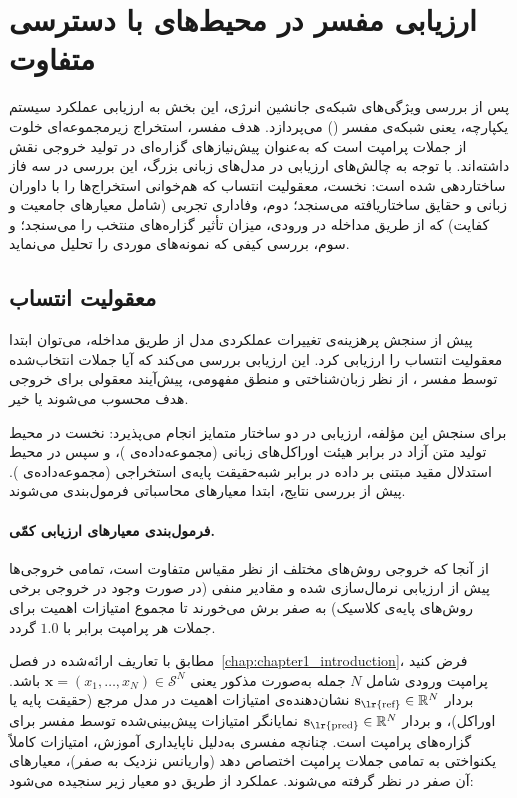 \section{ارزیابی مفسر در محیط‌های با دسترسی متفاوت}\label{sec:5-3}

پس از بررسی ویژگی‌های شبکه‌ی جانشین انرژی، این بخش به ارزیابی عملکرد سیستم یکپارچه، یعنی شبکه‌ی مفسر () می‌پردازد. هدف مفسر، استخراج زیرمجموعه‌ای خلوت از جملات پرامپت است که به‌عنوان پیش‌نیازهای گزاره‌ای در تولید خروجی نقش داشته‌اند. با توجه به چالش‌های ارزیابی در مدل‌های زبانی بزرگ، این بررسی در سه فاز ساختاردهی شده است: نخست، معقولیت انتساب که هم‌خوانی استخراج‌ها را با داوران زبانی و حقایق ساختاریافته می‌سنجد؛ دوم، وفاداری تجربی (شامل معیارهای جامعیت و کفایت) که از طریق مداخله در ورودی، میزان تأثیر گزاره‌های منتخب را می‌سنجد؛ و سوم، بررسی کیفی که نمونه‌های موردی را تحلیل می‌نماید.


\subsection{معقولیت انتساب}\label{sec:5-3-1}

پیش از سنجش پرهزینه‌ی تغییرات عملکردی مدل از طریق مداخله، می‌توان ابتدا معقولیت انتساب را ارزیابی کرد. این ارزیابی بررسی می‌کند که آیا جملات انتخاب‌شده توسط مفسر ، از نظر زبان‌شناختی و منطق مفهومی، پیش‌آیند معقولی برای خروجی هدف محسوب می‌شوند یا خیر. 

برای سنجش این مؤلفه، ارزیابی در دو ساختار متمایز انجام می‌پذیرد: نخست در محیط تولید متن آزاد در برابر هیئت اوراکل‌های زبانی (مجموعه‌داده‌ی )، و سپس در محیط استدلال مقید مبتنی بر داده در برابر شبه‌حقیقت پایه‌ی استخراجی (مجموعه‌داده‌ی ). پیش از بررسی نتایج، ابتدا معیارهای محاسباتی فرمول‌بندی می‌شوند.

\paragraph{فرمول‌بندی معیارهای ارزیابی کمّی.}
از آنجا که خروجی روش‌های مختلف از نظر مقیاس متفاوت است، تمامی خروجی‌ها پیش از ارزیابی نرمال‌سازی شده و مقادیر منفی (در صورت وجود در خروجی برخی روش‌های پایه‌ی کلاسیک) به صفر برش می‌خورند تا مجموع امتیازات اهمیت برای جملات هر پرامپت برابر با $1.0$ گردد. 

مطابق با تعاریف ارائه‌شده در فصل~\ref{chap:chapter1_introduction}، فرض کنید پرامپت ورودی شامل $N$ جمله به‌صورت مذکور یعنی $\mathbf{x} = (x_1, \dots, x_N) \in \mathcal{S}^N$ باشد. بردار $\mathbf{s}_{\text{\lr{ref}}} \in \mathbb{R}^N$ نشان‌دهنده‌ی امتیازات اهمیت در مدل مرجع (حقیقت پایه یا اوراکل)، و بردار $\mathbf{s}_{\text{\lr{pred}}} \in \mathbb{R}^N$ نمایانگر امتیازات پیش‌بینی‌شده توسط مفسر برای گزاره‌های پرامپت است. چنانچه مفسری به‌دلیل ناپایداری آموزش، امتیازات کاملاً یکنواختی به تمامی جملات پرامپت اختصاص دهد (واریانس نزدیک به صفر)، معیارهای آن صفر در نظر گرفته می‌شوند. عملکرد از طریق دو معیار زیر سنجیده می‌شود:

